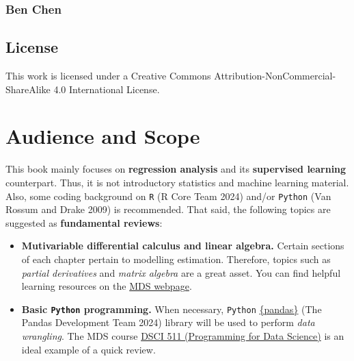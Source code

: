 \documentclass[
  letterpaper,
  DIV=11,
  numbers=noendperiod]{scrreprt}
\providecommand{\tightlist}{%
  \setlength{\itemsep}{0pt}\setlength{\parskip}{0pt}}\usepackage{longtable,booktabs,array}
\begin{document}
\subsection*{Ben Chen}\label{ben-chen}

\section*{License}\label{license}


This work is licensed under a Creative Commons
Attribution-NonCommercial-ShareAlike 4.0 International License.


\chapter*{Audience and Scope}\label{audience-and-scope}


This book mainly focuses on \textbf{regression analysis} and its
\textbf{supervised learning} counterpart. Thus, it is not introductory
statistics and machine learning material. Also, some coding background
on \texttt{R} (R Core Team 2024) and/or \texttt{Python} (Van Rossum and
Drake 2009) is recommended. That said, the following topics are
suggested as \textbf{fundamental reviews}:

\begin{itemize}
\tightlist
\item
  \textbf{Mutivariable differential calculus and linear algebra.}
  Certain sections of each chapter pertain to modelling estimation.
  Therefore, topics such as \emph{partial derivatives} and \emph{matrix
  algebra} are a great asset. You can find helpful learning resources on
  the
  \href{https://ubc-mds.github.io/resources_pages/learning_resources/}{MDS
  webpage}.
\item
  \textbf{Basic \texttt{Python} programming.} When necessary,
  \texttt{Python} \href{https://pypi.org/project/pandas/}{\{pandas\}}
  (The Pandas Development Team 2024) library will be used to perform
  \emph{data wrangling}. The MDS course
  \href{https://github.com/UBC-MDS/DSCI_511_prog-dsci}{DSCI 511
  (Programming for Data Science)} is an ideal example of a quick review.
\end{itemize}
\end{document}
